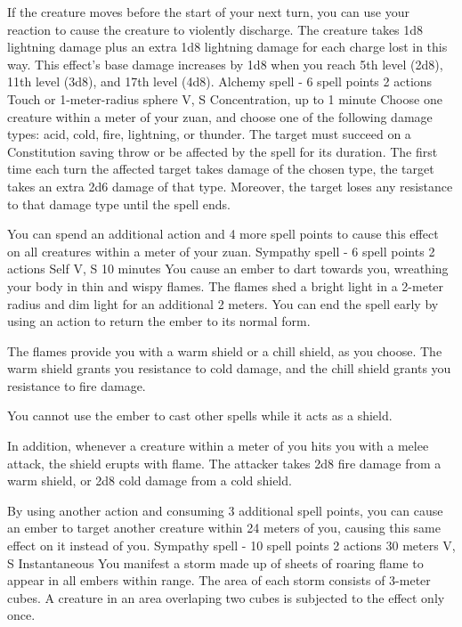     If the creature moves before the start of your next turn, you can use your reaction to cause the creature to violently discharge.
    The creature takes 1d8 lightning damage plus an extra 1d8 lightning damage for each charge lost in this way.
    This effect's base damage increases by 1d8 when you reach 5th level (2d8), 11th level (3d8), and 17th level (4d8).
    {Alchemy spell - 6 spell points}
    {2 actions}
    {Touch or 1-meter-radius sphere}
    {V, S}
    {Concentration, up to 1 minute}
    Choose one creature within a meter of your zuan, and choose one of the following damage types: acid, cold, fire, lightning, or thunder.
    The target must succeed on a Constitution saving throw or be affected by the spell for its duration.
    The first time each turn the affected target takes damage of the chosen type, the target takes an extra 2d6 damage of that type.
    Moreover, the target loses any resistance to that damage type until the spell ends.

    You can spend an additional action and 4 more spell points to cause this effect on all creatures within a meter of your zuan.
    {Sympathy spell - 6 spell points}
    {2 actions}
    {Self}
    {V, S}
    {10 minutes}
    You cause an ember to dart towards you, wreathing your body in thin and wispy flames.
    The flames shed a bright light in a 2-meter radius and dim light for an additional 2 meters.
    You can end the spell early by using an action to return the ember to its normal form.

    The flames provide you with a warm shield or a chill shield, as you choose.
    The warm shield grants you resistance to cold damage, and the chill shield grants you resistance to fire damage.

    You cannot use the ember to cast other spells while it acts as a shield.

    In addition, whenever a creature within a meter of you hits you with a melee attack, the shield erupts with flame.
    The attacker takes 2d8 fire damage from a warm shield, or 2d8 cold damage from a cold shield.

    By using another action and consuming 3 additional spell points, you can cause an ember to target another creature within 24 meters of you, causing this same effect on it instead of you.
    {Sympathy spell - 10 spell points}
    {2 actions}
    {30 meters}
    {V, S}
    {Instantaneous}
    You manifest a storm made up of sheets of roaring flame to appear in all embers within range.
    The area of each storm consists of 3-meter cubes.
    A creature in an area overlaping two cubes is subjected to the effect only once.

